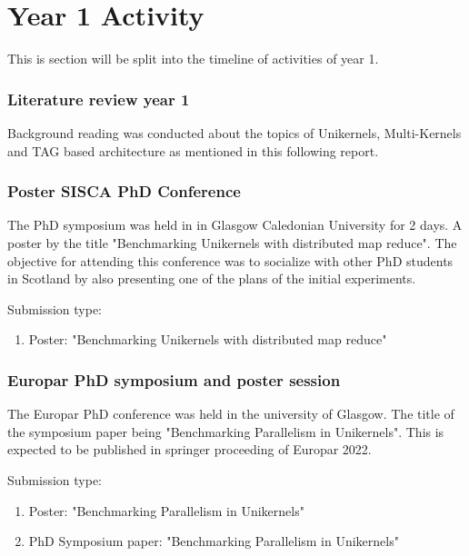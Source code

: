 
\chapter{Year 1 Activity}  %
This is section will be split into the timeline of activities of year 1.

\subsection{Literature review year 1}
Background reading was conducted about the topics of Unikernels, Multi-Kernels and 
TAG based architecture as mentioned in this following report. 

\subsection{Poster SISCA PhD Conference}
The PhD symposium was held in in Glasgow Caledonian University for 2 days. A poster 
by the title "Benchmarking Unikernels with distributed map reduce"\cite{Sisca2022Poster}. The
objective for attending this conference was to socialize with other PhD students 
in Scotland by also presenting one of the plans of the initial experiments. 

Submission type:
\begin{enumerate}
    \item Poster: "Benchmarking Unikernels with distributed map reduce"\cite{Sisca2022Poster}
\end{enumerate}

\subsection{Europar PhD symposium and poster session}
The Europar PhD conference was held in the university of Glasgow. The title 
of the symposium paper being "Benchmarking Parallelism in Unikernels"\cite{Europar2022Paper}. This 
is expected to be published in springer proceeding of Europar 2022. 

Submission type:
\begin{enumerate}
    \item Poster: "Benchmarking Parallelism in Unikernels"\cite{Europar2022Poster}
    \item PhD Symposium paper: "Benchmarking Parallelism in Unikernels"\cite{Europar2022Paper}
\end{enumerate}

